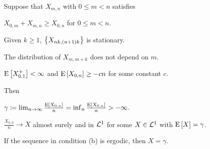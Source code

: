 \begin{theorem}
    Suppose that $X_{m,n}$ with $0\leq m<n$ satisfies 
    \begin{thmenum}
        \item $X_{0,m}+X_{m,n}\geq X_{0,n}$ for $0\leq m <n$. 
        \item Given $k\geq 1$, $\left\{ {X_{nk,(n+1)k}} \right\}$ is stationary. 
        \item The distribution of $X_{m,m+k}$ does not depend on $m$. 
        \item $\operatorname{E}\left[ {X_{0,1}^+} \right]<\infty$ and $\operatorname{E}\left[ {X_{0,n}} \right]\geq -cn$ 
        for some constant $c$. 
    \end{thmenum}
    Then 
    \begin{thmenum}
        \item $\gamma\coloneq\lim_{n\to\infty}\frac{\operatorname{E}\left[ {X_{0,n}} \right]}{n} = \inf_{n}\frac{\operatorname{E}\left[ {X_{0,n}} \right]}{n}>-\infty$. 
        \item $\frac{X_{0,n}}{n}\to X$ almost surely and in $\mathcal{L}^1$ for some $X\in\mathcal{L}^1$ with $\operatorname{E}\left[ {X} \right]=\gamma$.
        \item If the sequence in condition (b) is ergodic, then $X = \gamma$. 
    \end{thmenum}
\end{theorem}
